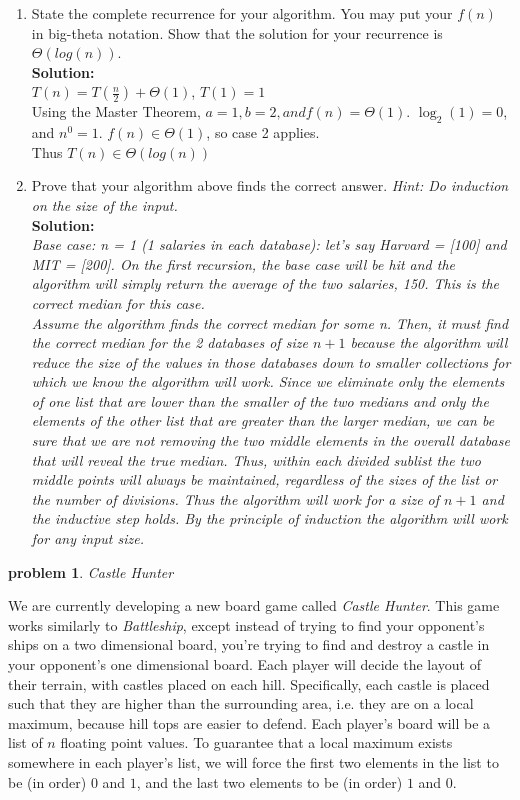 \documentclass[10pt]{article}
\newtheorem{problem}{\sc\color{cit}problem}
\begin{document}
\begin{enumerate}
    \item State the complete recurrence for your algorithm. You may put your $f(n)$ in big-theta notation. Show that the solution for your recurrence is $\Theta(log(n))$. \\
    \textbf{Solution: } \\
    $T(n) = T\left(\frac{n}{2}\right) + \Theta(1)$, $T(1) = 1$ \\
     Using the Master Theorem, $a = 1, b = 2, and f(n) = \Theta(1)$. $\log_2(1) = 0$, and $n^0 = 1$. $f(n) \in \Theta(1)$, so case 2 applies. \\
     Thus $T(n) \in \Theta(log(n))$
    \item Prove that your algorithm above finds the correct answer. \emph{Hint: Do induction on the size of the input.} \\
    \textbf{Solution: } \\
    \emph {
    Base case: n = 1 (1 salaries in each database): let's say Harvard = [100] and MIT = [200]. On the first recursion, the base case will be hit and the algorithm will simply return the average of the two salaries, 150. This is the correct median for this case. \\
    Assume the algorithm finds the correct median for some n. Then, it must find the correct median for the 2 databases of size $n + 1$ because the algorithm will reduce the size of the values in those databases down to smaller collections for which we know the algorithm will work. Since we eliminate only the elements of one list that are lower than the smaller of the two medians and only the elements of the other list that are greater than the larger median, we can be sure that we are not removing the two middle elements in the overall database that will reveal the true median. Thus, within each divided sublist the two middle points will always be maintained, regardless of the sizes of the list or the number of divisions. Thus the algorithm will work for a size of $n + 1$ and the inductive step holds. By the principle of induction the algorithm will work for any input size.}
\end{enumerate}

\begin{problem}Castle Hunter\end{problem}

We are currently developing a new board game called \textit{Castle Hunter}. This game works similarly to \textit{Battleship}, except instead of trying to find your opponent's ships on a two dimensional board, you're trying to find and destroy a castle in your opponent's one dimensional board.  Each player will decide the layout of their terrain, with castles placed on each hill.  Specifically, each castle is placed such that they are higher than the surrounding area, i.e. they are on a local maximum, because hill tops are easier to defend.  Each player's board will be a list of $n$ floating point values. To guarantee that a local maximum exists somewhere in each player's list, we will force the first two elements in the list to be (in order) $0$ and $1$, and the last two elements to be (in order) $1$ and $0$. 
\end{document}
